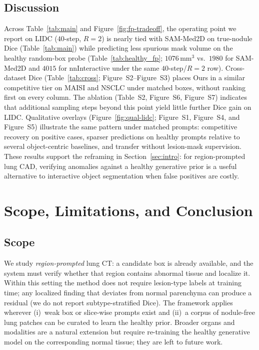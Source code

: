 \documentclass[letterpaper]{article} %
\newcommand{\suppFigQualFP}{Figure~S1}
\newcommand{\suppFigBench}{Figure~S2}
\newcommand{\suppFigBenchPer}{Figure~S3}
\newcommand{\suppFigQualCross}{Figure~S4}
\newcommand{\suppFigQualNSCLC}{Figure~S5}
\newcommand{\suppTabAblation}{Table~S2}
\newcommand{\suppFigAblation}{Figure~S6}
\newcommand{\suppFigQualAblation}{Figure~S7}
\begin{document}
\subsection{Discussion}
Across Table~\ref{tab:main} and
Figure~\ref{fig:fp-tradeoff}, the operating point we
report on LIDC (\(40\)-step, \(R{=}2\)) is nearly tied with SAM-Med2D on
true-nodule Dice (Table~\ref{tab:main}) while predicting less spurious mask
volume on the healthy random-box probe
(Table~\ref{tab:healthy_fp}; \(1076\,\mathrm{mm}^3\) vs.\ \(1980\) for
SAM-Med2D and \(4015\) for nnInteractive under the same \(40\)-step/\(R{=}2\)
row). Cross-dataset Dice
(Table~\ref{tab:cross}; \suppFigBench{}--\suppFigBenchPer{})
places Ours in a similar competitive tier on MAISI and NSCLC under matched
boxes, without ranking first on every column. The ablation
(\suppTabAblation{}, \suppFigAblation{}, \suppFigQualAblation{})
indicates that additional sampling steps beyond this point yield little
further Dice gain on LIDC. Qualitative overlays
(Figure~\ref{fig:qual-lidc}; \suppFigQualFP{}, \suppFigQualCross{}, and
\suppFigQualNSCLC{}) illustrate the same pattern under matched
prompts: competitive recovery on positive cases, sparser predictions on
healthy prompts relative to several object-centric baselines, and transfer
without lesion-mask supervision. These results support the reframing in
Section~\ref{sec:intro}: for region-prompted lung CAD, verifying anomalies
against a healthy generative prior is a useful alternative to interactive
object segmentation when false positives are costly.

\section{Scope, Limitations, and Conclusion}
\label{sec:conclusion}

\subsection{Scope}
We study \emph{region-prompted} lung CT: a candidate box is already
available, and the system must verify whether that region contains
abnormal tissue and localize it. Within this setting the method does not require lesion-type labels at
training time; any localized finding that deviates from normal parenchyma can
produce a residual (we do not report subtype-stratified Dice).
The framework applies wherever (i)~weak box or slice-wise prompts
exist and (ii)~a corpus of nodule-free lung patches can be curated
to learn the healthy prior. Broader organs and modalities are a
natural extension but require re-training the healthy generative
model on the corresponding normal tissue; they are left to future
work.
\end{document}
